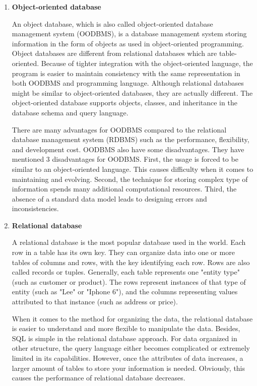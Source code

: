 \begin{enumerate}
	
	
	\item\textbf{Object-oriented database}
	\setlength{\parindent}{1em}		
	
	An object database, which is also called object-oriented database management system (OODBMS), is a database management system storing information in the form of objects as used in object-oriented programming.
	Object databases are different from relational databases which are table-oriented.
	Because of tighter integration with the object-oriented language, 
	the program is easier to maintain consistency with the same representation in both OODBMS and programming language.
	Although relational databases might be similar to object-oriented databases, they are actually different.
	The object-oriented database supports objects, classes, and inheritance in the database schema and query language.
	
	There are many advantages for OODBMS compared to the relational database management system (RDBMS) such as the performance, flexibility, and development cost.
	OODBMS also have some disadvantages. They have mentioned 3 disadvantages for OODBMS.
	First, the usage is forced to be similar to an object-oriented language.
	This causes difficulty when it comes to maintaining and evolving.
	Second, the technique for storing complex type of information spends many additional computational resources.
	Third, the absence of a standard data model leads to designing errors and inconsistencies.
	
	
	
	\item\textbf{Relational database}
	\setlength{\parindent}{1em}	
	
	A relational database is the most popular database used in the world.
	Each row in a table has its own key. 
	They can organize data into one or more tables of columns and rows, with the key identifying each row.
	Rows are also called records or tuples.
	Generally, each table represents one "entity type" (such as customer or product).
	The rows represent instances of that type of entity (such as "Lee" or "Iphone 6"), 
	and the columns representing values attributed to that instance (such as address or price).
	
	When it comes to the method for organizing the data, the relational database is easier to understand and more flexible to manipulate the data.
	Besides, SQL is simple in the relational database approach.
	For data organized in other structure, the query language either becomes complicated or extremely limited in its capabilities.
	However, once the attributes of data increases, a larger amount of tables to store your information is needed.
	Obviously, this causes the performance of relational database decreases.



\end{enumerate}
